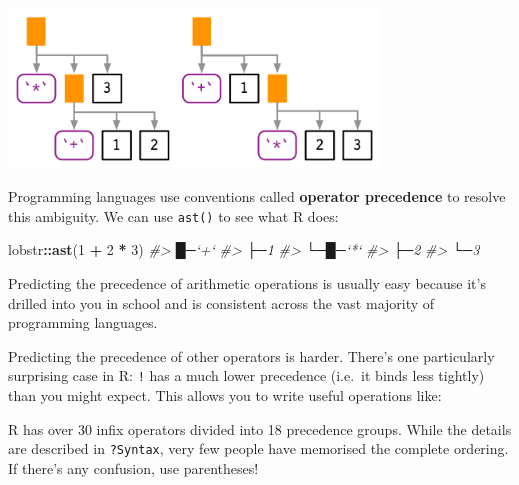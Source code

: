 \documentclass[]{book}
\newenvironment{Shaded}{\begin{snugshade}}{\end{snugshade}}
\newcommand{\CommentTok}[1]{\textcolor[rgb]{0.37,0.37,0.37}{\textit{#1}}}
\newcommand{\DecValTok}[1]{\textcolor[rgb]{0.06,0.06,0.06}{#1}}
\newcommand{\KeywordTok}[1]{\textcolor[rgb]{0.27,0.27,0.27}{\textbf{#1}}}
\newcommand{\NormalTok}[1]{#1}
\newcommand{\OperatorTok}[1]{\textcolor[rgb]{0.43,0.43,0.43}{\textbf{#1}}}
\newcommand{\StringTok}[1]{\textcolor[rgb]{0.5,0.5,0.5}{#1}}
\begin{document}
\begin{center}\includegraphics[width=3.89in]{diagrams/expressions/ambig-order} \end{center}

Programming languages use conventions called \textbf{operator precedence} to resolve this ambiguity. We can use \texttt{ast()} to see what R does:

\begin{Shaded}
\begin{Highlighting}[]
\NormalTok{lobstr}\OperatorTok{::}\KeywordTok{ast}\NormalTok{(}\DecValTok{1} \OperatorTok{+}\StringTok{ }\DecValTok{2} \OperatorTok{*}\StringTok{ }\DecValTok{3}\NormalTok{)}
\CommentTok{#> █─`+` }
\CommentTok{#> ├─1 }
\CommentTok{#> └─█─`*` }
\CommentTok{#>   ├─2 }
\CommentTok{#>   └─3}
\end{Highlighting}
\end{Shaded}

Predicting the precedence of arithmetic operations is usually easy because it's drilled into you in school and is consistent across the vast majority of programming languages.

Predicting the precedence of other operators is harder. There's one particularly surprising case in R: \texttt{!} has a much lower precedence (i.e.~it binds less tightly) than you might expect. This allows you to write useful operations like:

\begin{Shaded}
\end{Shaded}

R has over 30 infix operators divided into 18 precedence groups. While the details are described in \texttt{?Syntax}, very few people have memorised the complete ordering. If there's any confusion, use parentheses!
\end{document}

